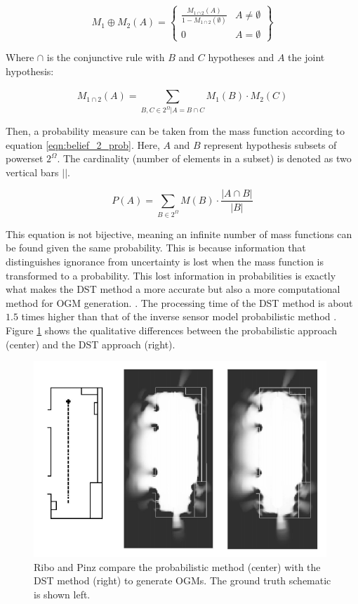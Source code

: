 \begin{equation} \label{eqn:fuse_dst}
	M_1 \oplus M_2 (A) = \left \{ 
	\begin{array}{ll} 
	\frac{M_{1 \cap 2}(A)}{1 - M_{1 \cap 2}(\emptyset)} & A \not = \emptyset \\
	0	&	 A = \emptyset
	\end{array} \right \}
\end{equation}

Where $\cap$ is the conjunctive rule with $B$ and $C$ hypotheses and $A$ the joint hypothesis:

\begin{equation} \label{eqn:conj_rule}
	M_{1 \cap 2}(A) = \sum_{B, C \in 2^\Omega | A = B \cap C}^{} M_1(B) \cdot M_2(C)
\end{equation}

Then, a probability measure can be taken from the mass function according to equation \ref{eqn:belief_2_prob}. Here, $A$ and $B$ represent hypothesis subsets of powerset $2^\Omega$. The cardinality (number of elements in a subset) is denoted as two vertical bars $\vert \vert$.

\begin{equation} \label{eqn:belief_2_prob}
	P(A) = \sum_{B \in 2^\Omega}^{} M(B) \cdot \frac{\vert A \cap B \vert}{\vert B \vert}
\end{equation}

This equation is not bijective, meaning an infinite number of mass functions can be found given the same probability. This is because information that distinguishes ignorance from uncertainty is lost when the mass function is transformed to a probability. This lost information in probabilities is exactly what makes the DST method a more accurate but also a more computational method for \gls{OGM} generation. \cite{moras2014evidential}. The processing time of the DST method is about $1.5$ times higher than that of the inverse sensor model probabilistic method \cite{ribo2001comparison}. Figure \ref{fig:OGM_prob_DST_comp} shows the qualitative differences between the probabilistic approach (center) and the DST approach (right).  

\begin{figure}[h]
	\centering
	\includegraphics[width=0.6\linewidth]{Figures/Occupancy_Grid_Map/OGM_prob_l_DST_r_compare}
	\caption{Ribo and Pinz \cite{ribo2001comparison} compare the probabilistic method (center) with the DST method (right) to generate OGMs. The ground truth schematic is shown left.}
	\label{fig:OGM_prob_DST_comp}
\end{figure}

